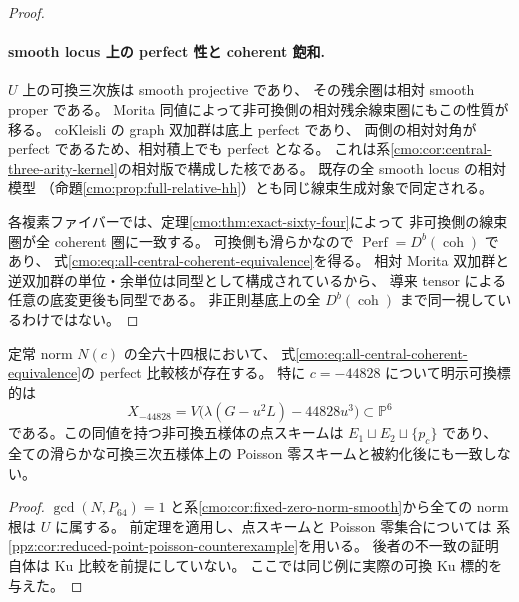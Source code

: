 \begin{proof}
\paragraph{smooth locus 上の perfect 性と coherent 飽和.}
$U$ 上の可換三次族は smooth projective であり、
その残余圏は相対 smooth proper である。
Morita 同値によって非可換側の相対残余線束圏にもこの性質が移る。
coKleisli の graph 双加群は底上 perfect であり、
両側の相対対角が perfect であるため、相対積上でも perfect となる。
これは系\ref{cmo:cor:central-three-arity-kernel}の相対版で構成した核である。
既存の全 smooth locus の相対模型
（命題\ref{cmo:prop:full-relative-hh}）とも同じ線束生成対象で同定される。

各複素ファイバーでは、定理\ref{cmo:thm:exact-sixty-four}によって
非可換側の線束圏が全 coherent 圏に一致する。
可換側も滑らかなので $\operatorname{Perf}=D^b(\operatorname{coh})$ であり、
式\eqref{cmo:eq:all-central-coherent-equivalence}を得る。
相対 Morita 双加群と逆双加群の単位・余単位は同型として構成されているから、
導来 tensor による任意の底変更後も同型である。
非正則基底上の全 $D^b(\operatorname{coh})$ まで同一視しているわけではない。
\end{proof}

\begin{corollary}
\label{cmo:cor:norm-commutative-kernel}
定常 norm $N(c)$ の全六十四根において、
式\eqref{cmo:eq:all-central-coherent-equivalence}の perfect 比較核が存在する。
特に $c=-44828$ について明示可換標的は
\[
 X_{-44828}
   =V\bigl(\lambda(G-u^2L)-44828u^3\bigr)\subset\mathbb P^6
\]
である。この同値を持つ非可換五様体の点スキームは
$E_1\sqcup E_2\sqcup\{p_c\}$ であり、
全ての滑らかな可換三次五様体上の Poisson 零スキームと被約化後にも一致しない。
\end{corollary}
\begin{proof}
$\gcd(N,P_{64})=1$ と系\ref{cmo:cor:fixed-zero-norm-smooth}から全ての norm 根は $U$ に属する。
前定理を適用し、点スキームと Poisson 零集合については
系\ref{ppz:cor:reduced-point-poisson-counterexample}を用いる。
後者の不一致の証明自体は Ku 比較を前提にしていない。
ここでは同じ例に実際の可換 Ku 標的を与えた。
\end{proof}

